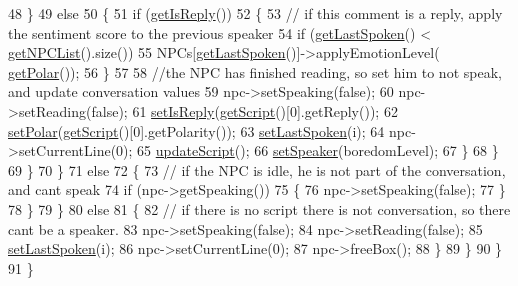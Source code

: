 \begin{DoxyCode}
48                             \}
49                             \textcolor{keywordflow}{else}
50                             \{
51                                 \textcolor{keywordflow}{if} (\hyperlink{class_base___group_a878700b51979d0acd3eb83cdfa4c0449}{getIsReply}())
52                                 \{
53                                     \textcolor{comment}{// if this comment is a reply, apply the sentiment score to the
       previous speaker}
54                                     \textcolor{keywordflow}{if} (\hyperlink{class_base___group_a8fb88afb104365ec23447ee1f3649b4c}{getLastSpoken}() < 
      \hyperlink{class_base___group_a75eec9132aaf532b4429e0af76b31775}{getNPCList}().size())
55                                         NPCs[\hyperlink{class_base___group_a8fb88afb104365ec23447ee1f3649b4c}{getLastSpoken}()]->applyEmotionLevel(
      \hyperlink{class_base___group_a57cd8ebf1eee11eab80816ee87223f36}{getPolar}());
56                                 \}
57 
58                                 \textcolor{comment}{//the NPC has finished reading, so set him to not speak, and update
       conversation values}
59                                 npc->setSpeaking(\textcolor{keyword}{false});
60                                 npc->setReading(\textcolor{keyword}{false});
61                                 \hyperlink{class_base___group_aebe2b457ac29aefcc7105908a61460c8}{setIsReply}(\hyperlink{class_base___group_a48dadfbc8cdefca9bdd2c42b99115ad8}{getScript}()[0].getReply());
62                                 \hyperlink{class_base___group_a36ef627854f502a064fca8aea44a22fe}{setPolar}(\hyperlink{class_base___group_a48dadfbc8cdefca9bdd2c42b99115ad8}{getScript}()[0].getPolarity());
63                                 \hyperlink{class_base___group_a07e58c944f222f5c3d3b33c8adf83d14}{setLastSpoken}(i);
64                                 npc->setCurrentLine(0);
65                                 \hyperlink{class_base___group_a8c16feac44492aa68f4ee758662892c8}{updateScript}();
66                                 \hyperlink{class_n_p_c___group_a5c1f3d1ad1f50910bb912ed828615ff8}{setSpeaker}(boredomLevel);
67                             \}
68                         \}
69                     \}
70                 \}
71                 \textcolor{keywordflow}{else}
72                 \{
73                     \textcolor{comment}{// if the NPC is idle, he is not part of the conversation, and cant speak}
74                     \textcolor{keywordflow}{if} (npc->getSpeaking())
75                     \{
76                         npc->setSpeaking(\textcolor{keyword}{false});
77                     \}
78                 \}
79             \}
80             \textcolor{keywordflow}{else}
81             \{
82                 \textcolor{comment}{// if there is no script there is not conversation, so there cant be a speaker.}
83                 npc->setSpeaking(\textcolor{keyword}{false});
84                 npc->setReading(\textcolor{keyword}{false});
85                 \hyperlink{class_base___group_a07e58c944f222f5c3d3b33c8adf83d14}{setLastSpoken}(i);
86                 npc->setCurrentLine(0);
87                 npc->freeBox();
88             \}
89         \}
90     \}
91 \}
\end{DoxyCode}


